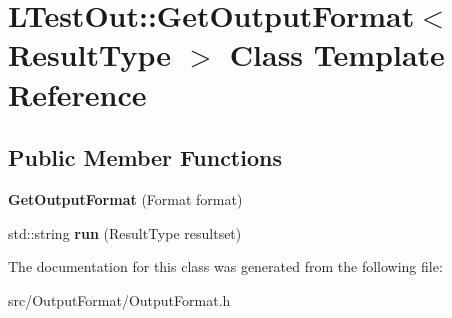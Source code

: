 \hypertarget{class_l_test_out_1_1_get_output_format}{\section{L\-Test\-Out\-:\-:Get\-Output\-Format$<$ Result\-Type $>$ Class Template Reference}
\label{class_l_test_out_1_1_get_output_format}
}
\subsection*{Public Member Functions}
\begin{DoxyCompactItemize}
\item 
\hypertarget{class_l_test_out_1_1_get_output_format_a6faf795f7eba120704e742c2cad82747}{{\bfseries Get\-Output\-Format} (Format format)}\label{class_l_test_out_1_1_get_output_format_a6faf795f7eba120704e742c2cad82747}

\item 
\hypertarget{class_l_test_out_1_1_get_output_format_aa356900a8afcd91fbdf21f320f7de873}{std\-::string {\bfseries run} (Result\-Type resultset)}\label{class_l_test_out_1_1_get_output_format_aa356900a8afcd91fbdf21f320f7de873}

\end{DoxyCompactItemize}


The documentation for this class was generated from the following file\-:\begin{DoxyCompactItemize}
\item 
src/\-Output\-Format/Output\-Format.\-h\end{DoxyCompactItemize}
